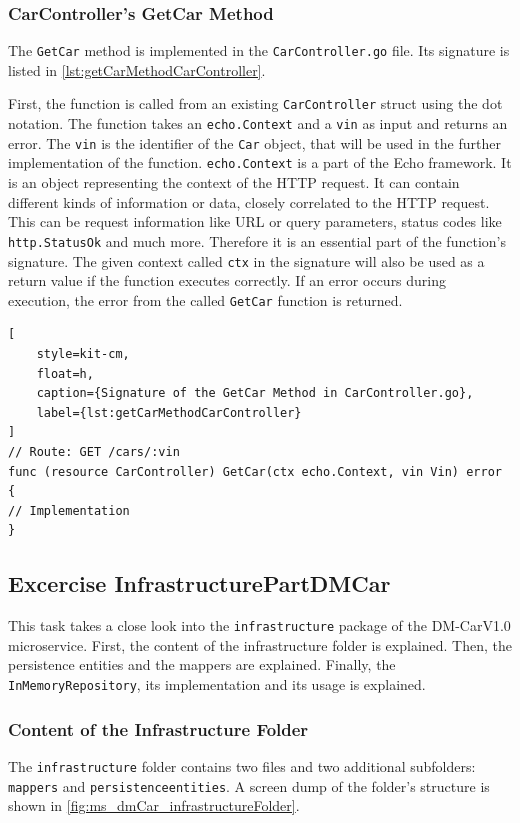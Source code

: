 \subsubsection*{CarController's GetCar Method}
The \texttt{GetCar} method is implemented in the \texttt{CarController.go} file.
Its signature is listed in \autoref{lst:getCarMethodCarController}.

First, the function is called from an existing \texttt{CarController} struct using the dot notation.
The function takes an \texttt{echo.Context} and a \texttt{vin} as input and returns an error.
The \texttt{vin} is the identifier of the \texttt{Car} object, that will be used in the further implementation of the function.
\texttt{echo.Context} is a part of the Echo framework.
It is an object representing the context of the HTTP request.
It can contain different kinds of information or data, closely correlated to the HTTP request.
This can be request information like URL or query parameters, status codes like \texttt{http.StatusOk} and much more.
Therefore it is an essential part of the function's signature.
The given context called \texttt{ctx} in the signature will also be used as a return value if the function executes correctly.
If an error occurs during execution, the error from the called \texttt{GetCar} function is returned.

\begin{lstlisting}[
    style=kit-cm,
    float=h,
    caption={Signature of the GetCar Method in CarController.go},
    label={lst:getCarMethodCarController}
]
// Route: GET /cars/:vin
func (resource CarController) GetCar(ctx echo.Context, vin Vin) error {
// Implementation
}
\end{lstlisting}
\subsection{Excercise InfrastructurePartDMCar}
This task takes a close look into the \texttt{infrastructure} package of the DM-CarV1.0 microservice.
First, the content of the infrastructure folder is explained.
Then, the persistence entities and the mappers are explained.
Finally, the \texttt{InMemoryRepository}, its implementation and its usage is explained.

\subsubsection*{Content of the Infrastructure Folder}
The \texttt{infrastructure} folder contains two files and two additional subfolders: \texttt{mappers} and \texttt{persistenceentities}.
A screen dump of the folder's structure is shown in \autoref{fig:ms_dmCar_infrastructureFolder}.

